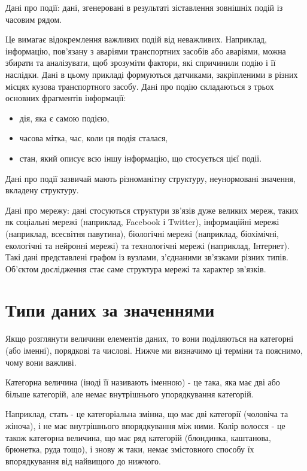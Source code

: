 \begin{ozn}
Дані про події: дані, згенеровані в результаті зіставлення зовнішніх подій із часовим рядом.  
\end{ozn}

Це вимагає відокремлення важливих подій від неважливих. Наприклад, інформацію, пов'язану з аваріями транспортних засобів або аваріями, можна збирати та аналізувати, щоб зрозуміти фактори, які спричинили подію і її наслідки. Дані в цьому прикладі формуються датчиками, закріпленими в різних місцях кузова транспортного засобу. Дані про подію складаються з трьох основних фрагментів інформації: 

\begin{itemize}
 \item дія, яка є самою подією, 
 \item часова мітка, час, коли ця подія сталася,
 \item стан, який описує всю іншу інформацію, що стосується цієї події.
\end{itemize}

Дані про події зазвичай мають різноманітну структуру, неунормовані значення, вкладену структуру.

\begin{ozn}
Дані про мережу: дані стосуються структури зв'язів дуже великих мереж, таких як соціальні мережі (наприклад, Facebook і Twitter), інформаційні мережі (наприклад, всесвітня павутина), біологічні мережі (наприклад, біохімічні, екологічні та нейронні мережі) та технологічні мережі (наприклад, Інтернет). Такі дані представлені графом із вузлами, з'єднаними зв'язками різних типів. Об'єктом дослідження стає саме структура мережі та характер зв'язків.
\end{ozn}

\section{Типи даних за значеннями}

Якщо розглянути величини елементів даних, то вони поділяються на категорні (або іменні), порядкові та числові. Нижче ми визначимо ці терміни та пояснимо, чому вони важливі.

\begin{ozn}
Категорна величина (іноді її називають іменною) - це така, яка має дві або більше категорій, але немає внутрішнього упорядкування категорій. 
\end{ozn}

Наприклад, стать - це категоріальна змінна, що має дві категорії (чоловіча та жіноча), і не має внутрішнього впорядкування між ними. Колір волосся - це також категорна величина, що має ряд категорій (блондинка, каштанова, брюнетка, руда тощо), і знову ж таки, немає змістовного способу їх впорядкування від найвищого до нижчого.


